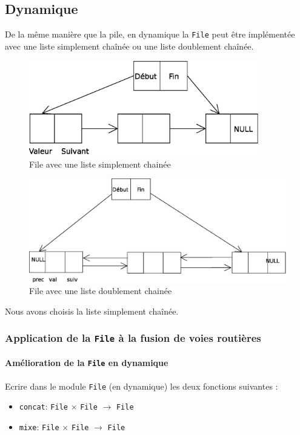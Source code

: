 	\subsection{Dynamique}
	De la même manière que la pile, en dynamique la \texttt{File} peut être implémentée avec une liste simplement chaînée ou une liste doublement chaînée.
\begin{figure}[H]
\centering
\includegraphics[width=10cm]{content/schemas/file.eps}
\caption{File avec une liste simplement chainée}
\end{figure}

\begin{figure}[H]
\centering
\includegraphics[width=15cm]{content/schemas/fileDoubleChaine.eps}
\caption{File avec une liste doublement chainée}
\end{figure}
Nous avons choisis la liste simplement chaînée.


\subsubsection{Application de la \texttt{File} à la fusion de voies routières}
\paragraph{Amélioration de la \texttt{File} en dynamique} Ecrire dans le module \texttt{File} (en dynamique) les deux fonctions suivantes : 
\begin{itemize}
	\item \texttt{concat}: \texttt{File} $\times$ \texttt{File} $\rightarrow$ \texttt{File}
	\item \texttt{mixe}: \texttt{File} $\times$ \texttt{File} $\rightarrow$ \texttt{File}
\end{itemize} ~

